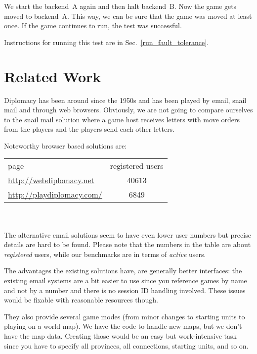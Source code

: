 \documentclass[11pt,a4paper]{report}
\newcommand{\hi}[1]{{\color{red}\em #1\/}\\}
\begin{document}
We start the backend~A again and then halt backend~B. Now the game gets moved to
backend~A. This way, we can be sure that the game was moved at least once.
If the game continues to run, the test was successful.

Instructions for running this test are in Sec.~\ref{run_fault_tolerance}.

\chapter{Related Work}


Diplomacy has been around since the 1950s and has been played by email, snail
mail and through web browsers. Obviously, we are not going to compare ourselves
to the snail mail solution where a game host receives letters with move orders
from the players and the players send each other letters.

Noteworthy browser based solutions are:\\

\begin{tabular}{lc}
  page                            & registered users \\
  \url{http://webdiplomacy.net}   & 40613 \\
  \url{http://playdiplomacy.com/} & 6849
\end{tabular}
\\
\\The alternative email solutions seem to have even lower user numbers but
precise details are hard to be found. Please note that the numbers in
the table are about {\em registered\/} users, while our benchmarks are in terms
of {\em active\/} users.

The advantages the existing solutions have, are generally better interfaces:
the existing email systems are a bit easier to use since you reference games by
name and not by a number and there is no session ID handling involved.
These issues would be fixable with reasonable resources though.

They also provide several game modes (from minor changes to starting units to
playing on a world map). We have the code to handle new maps, but we don't have
the map data. Creating those would be an easy but work-intensive task since
you have to specify all provinces, all connections, starting units, and so on.
\end{document}
